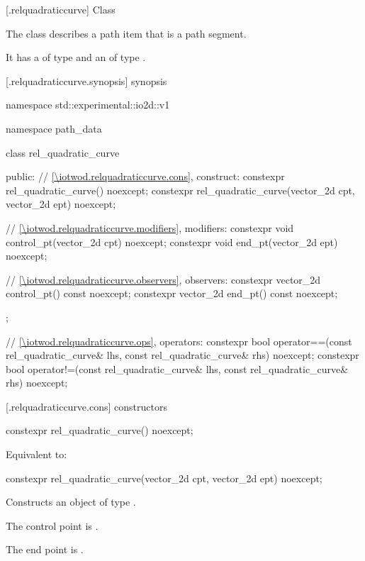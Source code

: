  [\iotwod.relquadraticcurve] {Class }

\pnum
{}%
The class  describes a path item that is a path segment.

\pnum
It has a  of type  and an  of type .

 [\iotwod.relquadraticcurve.synopsis] { synopsis}

\begin{codeblock}
namespace std::experimental::io2d::v1 {
  namespace path_data {
    class rel_quadratic_curve {
    public:
      // \ref{\iotwod.relquadraticcurve.cons}, construct:
      constexpr rel_quadratic_curve() noexcept;
      constexpr rel_quadratic_curve(vector_2d cpt, vector_2d ept)
        noexcept;

      // \ref{\iotwod.relquadraticcurve.modifiers}, modifiers:
      constexpr void control_pt(vector_2d cpt) noexcept;
      constexpr void end_pt(vector_2d ept) noexcept;

      // \ref{\iotwod.relquadraticcurve.observers}, observers:
      constexpr vector_2d control_pt() const noexcept;
      constexpr vector_2d end_pt() const noexcept;
    };
    
    // \ref{\iotwod.relquadraticcurve.ops}, operators:
    constexpr bool operator==(const rel_quadratic_curve& lhs,
      const rel_quadratic_curve& rhs) noexcept;
    constexpr bool operator!=(const rel_quadratic_curve& lhs,
      const rel_quadratic_curve& rhs) noexcept;
  }
}
\end{codeblock}

 [\iotwod.relquadraticcurve.cons] { constructors}

%
\begin{itemdecl}
constexpr rel_quadratic_curve() noexcept;
\end{itemdecl}
\begin{itemdescr}
\pnum
\effects
Equivalent to: 
\end{itemdescr}

%
\begin{itemdecl}
constexpr rel_quadratic_curve(vector_2d cpt, vector_2d ept)
  noexcept;
\end{itemdecl}
\begin{itemdescr}
\pnum
\effects
Constructs an object of type .

\pnum
The control point is .

\pnum
The end point is .
\end{itemdescr}


